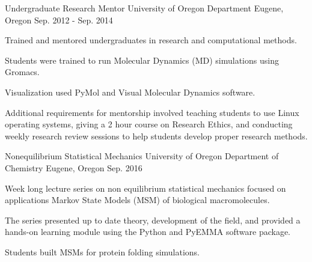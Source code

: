 \begin{cventries}
  \cventry
    {Undergraduate Research Mentor}
    {University of Oregon Department}
    {Eugene, Oregon}
    {Sep. 2012 - Sep. 2014}
    {
      \begin{cvitems}
        \item{Trained and mentored undergraduates in research and computational methods.}
        \item{Students were trained to run Molecular Dynamics (MD) simulations using Gromacs.}
        \item{Visualization used PyMol and Visual Molecular Dynamics software.}
        \item{Additional requirements for mentorship involved teaching students to use Linux operating systems, giving a 2 hour course on Research Ethics, and conducting weekly research review sessions to help students develop proper research methods.}
      \end{cvitems}
    }

  \cventry
    {Nonequilibrium Statistical Mechanics}
    {University of Oregon Department of Chemistry}
    {Eugene, Oregon}
    {Sep. 2016}
    {
      \begin{cvitems}
        \item{Week long lecture series on non equilibrium statistical mechanics focused on applications Markov State Models (MSM) of biological macromolecules.}
        \item{The series presented up to date theory, development of the field, and provided a hands-on learning module using the Python and PyEMMA software package.}
        \item{Students built MSMs for protein folding simulations.}
      \end{cvitems}
    }
\end{cventries}
